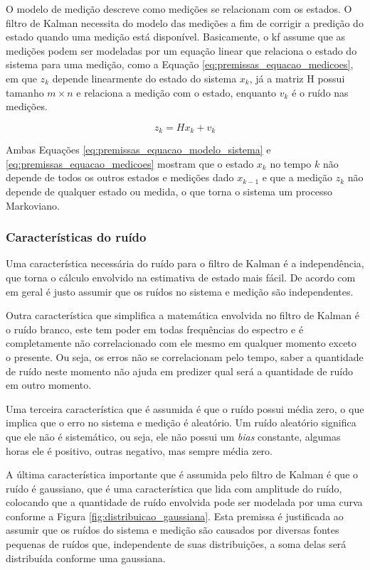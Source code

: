 \documentclass[acronym, symbols]{fei}
\begin{document}
				O modelo de medição descreve como medições se relacionam com os estados. O filtro de Kalman necessita do modelo das medições a fim de corrigir a predição do estado quando uma medição está disponível. Basicamente, o \acrshort{kf} assume que as medições podem ser modeladas por um equação linear que relaciona o estado do sistema para uma medição, como a Equação \eqref{eq:premissas_equacao_medicoes}, em que $z_k$ depende linearmente do estado do sistema $x_k$, já a matriz H possui tamanho $m \times n$ e relaciona a medição com o estado, enquanto $v_k$ é o ruído nas medições.
				
				\begin{equation}\label{eq:premissas_equacao_medicoes}
					z_k = Hx_k + v_k
				\end{equation}
			
				Ambas Equações \eqref{eq:premissas_equacao_modelo_sistema} e \eqref{eq:premissas_equacao_medicoes} mostram que o estado $x_k$ no tempo $k$ não depende de todos os outros estados e medições dado $x_{k-1}$ e que a medição $z_k$ não depende de qualquer estado ou medida, o que torna o sistema um processo Markoviano.
			
			\subsubsection{Características do ruído}
				
				Uma característica necessária do ruído para o filtro de Kalman é a independência, que torna o cálculo envolvido na estimativa de estado mais fácil. De acordo com \textcite{phdthesisNegenborn} em geral é justo assumir que os ruídos no sistema e medição são independentes.
				
				Outra característica que simplifica a matemática envolvida no filtro de Kalman é o ruído branco, este tem poder em todas frequências do espectro e é completamente não correlacionado com ele mesmo em qualquer momento exceto o presente. Ou seja, os erros não se correlacionam pelo tempo, saber a quantidade de ruído neste momento não ajuda em predizer qual será a quantidade de ruído em outro momento.
				
				Uma terceira característica que é assumida é que o ruído possui média zero, o que implica que o erro no sistema e medição é aleatório. Um ruído aleatório significa que ele não é sistemático, ou seja, ele não possui um \textit{bias} constante, algumas horas ele é positivo, outras negativo, mas sempre média zero.
				
				A última característica importante que é assumida pelo filtro de Kalman é que o ruído é gaussiano, que é uma característica que lida com amplitude do ruído, colocando que a quantidade de ruído envolvida pode ser modelada por uma curva conforme a Figura \ref{fig:distribuicao_gaussiana}. Esta premissa é justificada ao assumir que os ruídos do sistema e medição são causados por diversas fontes pequenas de ruídos que, independente de suas distribuições, a soma delas será distribuída conforme uma gaussiana.
				
\end{document}
